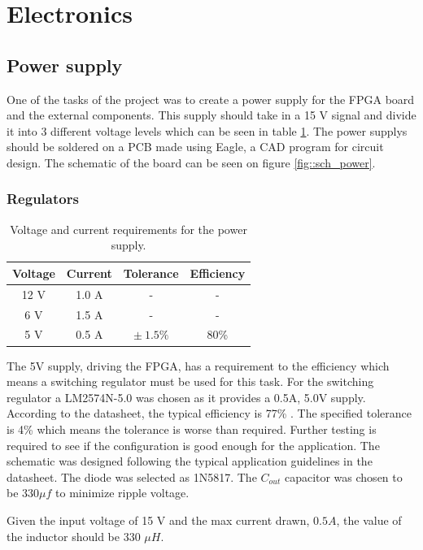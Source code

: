 \section{Electronics}
\subsection{Power supply}
One of the tasks of the project was to create a power supply for the FPGA board and the external components. This supply should take in a 15 V signal and divide it into 3 different voltage levels which can be seen in table \ref{tab::power_req}. The power supplys should be soldered on a PCB made using Eagle, a CAD program for circuit design. The schematic of the board can be seen on figure \ref{fig::sch_power}.
\subsubsection{Regulators}
\begin{table}
 \vspace{5 pt}
 \begin{tabular}{cccc}
  Voltage & Current & Tolerance      & Efficiency \\ \toprule
  12 V    & 1.0 A   & -              & -          \\
  6 V     & 1.5 A   & -              & -          \\
  5 V     & 0.5 A   & $\pm\ 1.5 \%$  & 80\%       \\
  \bottomrule
 \end{tabular}
\caption{Voltage and current requirements for the power supply.}
\label{tab::power_req}
 \vspace{5 pt}
\end{table}
The 5V supply, driving the FPGA, has a requirement to the efficiency which means a switching regulator must be used for this task. 
For the switching regulator a LM2574N-5.0 was chosen as it provides a 0.5A, 5.0V supply.
According to the datasheet, the typical efficiency is 77\% \cite{ds:LM2574N}.
The specified tolerance is 4\% which means the tolerance is worse than required. Further testing is required to see if the configuration is good enough for the application\cite[p. 1]{ds:LM2574N}.
The schematic was designed following the typical application guidelines in the datasheet.
The diode was selected as 1N5817\cite[p. 17]{ds:LM2574N}. 
The $C_{out}$ capacitor was chosen to be $330\mu f$ to minimize ripple voltage\cite[p. 19]{ds:LM2574N}.

Given the input voltage of 15 V and the max current drawn, $0.5 A$, the value of the inductor should be 330 $\mu H$\cite[p. 14]{ds:LM2574N}.

